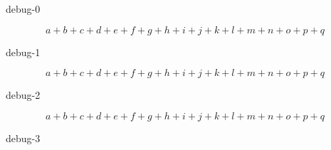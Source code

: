 \documentclass[twocolumn]{revtex4-1}
\begin{document}
{debug-0}\;\lipsum[66]
\begin{widetext}
\[
a + b + c + d + e + f + g + h + i + j + k + l + m + n + o + p + q
\]
\end{widetext}

{debug-1}\;\lipsum[66]
\begin{widetext}
\[
a + b + c + d + e + f + g + h + i + j + k + l + m + n + o + p + q
\]
\end{widetext}

{debug-2}\;\lipsum[66]
\begin{widetext}
\[
a + b + c + d + e + f + g + h + i + j + k + l + m + n + o + p + q
\]
\end{widetext}

{debug-3}\;\lipsum[66]
\end{document}
